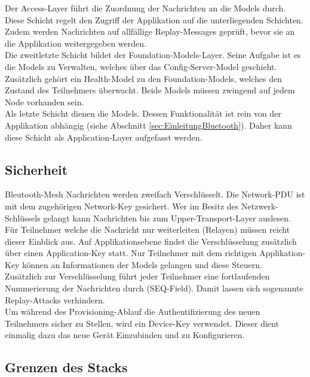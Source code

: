 Der Access-Layer führt die Zuordnung der Nachrichten an die Models durch. Diese Schicht regelt den Zugriff der Applikation auf die unterliegenden Schichten. Zudem werden Nachrichten auf allfällige Replay-Messages geprüft, bevor sie an die Applikation weitergegeben werden. \\

Die zweitletzte Schicht bildet der Foundation-Models-Layer. Seine Aufgabe ist es die Models zu Verwalten, welches über das Config-Server-Model geschieht. Zusätzlich gehört ein Health-Model zu den Foundation-Models, welches den Zustand des Teilnehmers überwacht. Beide Models müssen zwingend auf jedem Node vorhanden sein. \cite{bluetooth_sig_mesh_netzwerk_spezifikationen_2020} \cite{bluetooth_sig_mesh-technology-overviewpdf_2020}  \\

Als letzte Schicht dienen die Models. Dessen Funktionalität ist rein von der Applikation abhängig (siehe Abschnitt \ref{sec:EinleitungBluetooth}). Daher kann diese Schicht als Application-Layer aufgefasst werden.  \\


\subsection{Sicherheit}\label{subsec:BleutoothMeshSicherheit}
Bleutooth-Mesh Nachrichten werden zweifach Verschlüsselt. Die Network-PDU ist mit dem zugehörigen Network-Key gesichert. Wer im Besitz des Netzwerk-Schlüssels gelangt kann Nachrichten bis zum Upper-Transport-Layer auslesen. Für Teilnehmer welche die Nachricht nur weiterleiten (Relayen) müssen reicht dieser Einblick aus. Auf Applikationsebene findet die Verschlüsselung zusätzlich über einen Application-Key statt. Nur Teilnehmer mit dem richtigen Applikation-Key können an Informationen der Models gelangen und diese Steuern. \\

Zusätzlich zur Verschlüsselung führt jeder Teilnehmer eine fortlaufenden Nummerierung der Nachrichten durch (SEQ-Field). Damit lassen sich sogenannte Replay-Attacks verhindern. \\

Um während des Provisioning-Ablauf die Authentifizierung des neuen Teilnehmers sicher zu Stellen, wird ein Device-Key verwendet. Dieser dient einmalig dazu das neue Gerät Einzubinden und zu Konfigurieren. 


\subsection{Grenzen des Stacks}\label{subsec:BLEMeshProtokollStack}

